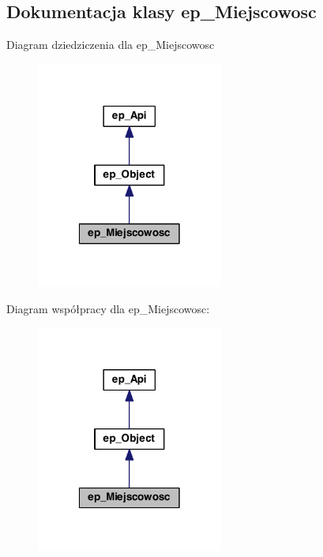 \hypertarget{classep___miejscowosc}{\subsection{Dokumentacja klasy ep\-\_\-\-Miejscowosc}
\label{classep___miejscowosc}
}


Diagram dziedziczenia dla ep\-\_\-\-Miejscowosc\nopagebreak
\begin{figure}[H]
\begin{center}
\leavevmode
\includegraphics[width=174pt]{classep___miejscowosc__inherit__graph}
\end{center}
\end{figure}


Diagram współpracy dla ep\-\_\-\-Miejscowosc\-:\nopagebreak
\begin{figure}[H]
\begin{center}
\leavevmode
\includegraphics[width=174pt]{classep___miejscowosc__coll__graph}
\end{center}
\end{figure}
